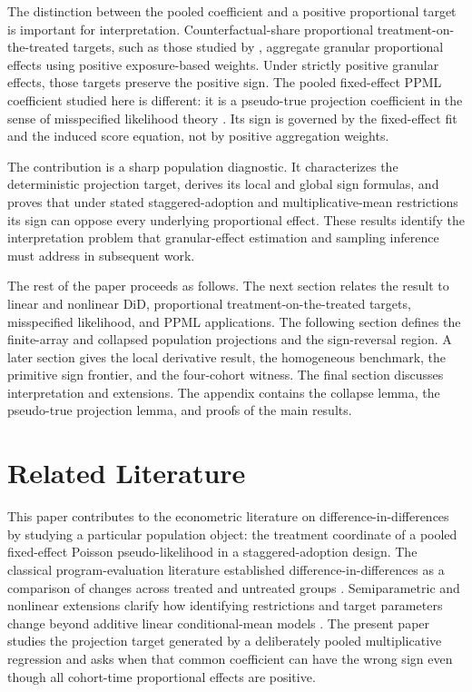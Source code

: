 \documentclass[11pt]{article}
\begin{document}
The distinction between the pooled coefficient and a positive proportional target is important for interpretation. Counterfactual-share proportional treatment-on-the-treated targets, such as those studied by \citet{MoreauKastler2025PTT}, aggregate granular proportional effects using positive exposure-based weights. Under strictly positive granular effects, those targets preserve the positive sign. The pooled fixed-effect PPML coefficient studied here is different: it is a pseudo-true projection coefficient in the sense of misspecified likelihood theory \citep{White1982MisspecifiedML,GourierouxMonfortTrognon1984Theory,GourierouxMonfortTrognon1984Poisson}. Its sign is governed by the fixed-effect fit and the induced score equation, not by positive aggregation weights.

The contribution is a sharp population diagnostic. It characterizes the deterministic projection target, derives its local and global sign formulas, and proves that under stated staggered-adoption and multiplicative-mean restrictions its sign can oppose every underlying proportional effect. These results identify the interpretation problem that granular-effect estimation and sampling inference must address in subsequent work.

The rest of the paper proceeds as follows. The next section relates the result to linear and nonlinear DiD, proportional treatment-on-the-treated targets, misspecified likelihood, and PPML applications. The following section defines the finite-array and collapsed population projections and the sign-reversal region. A later section gives the local derivative result, the homogeneous benchmark, the primitive sign frontier, and the four-cohort witness. The final section discusses interpretation and extensions. The appendix contains the collapse lemma, the pseudo-true projection lemma, and proofs of the main results.


\section{Related Literature}

This paper contributes to the econometric literature on difference-in-differences by studying a particular population object: the treatment coordinate of a pooled fixed-effect Poisson pseudo-likelihood in a staggered-adoption design. The classical program-evaluation literature established difference-in-differences as a comparison of changes across treated and untreated groups \citep{AshenfelterCard1985,AngristPischke2009,ImbensWooldridge2009}. Semiparametric and nonlinear extensions clarify how identifying restrictions and target parameters change beyond additive linear conditional-mean models \citep{Abadie2005,AtheyImbens2006,SantAnnaZhao2020}. The present paper studies the projection target generated by a deliberately pooled multiplicative regression and asks when that common coefficient can have the wrong sign even though all cohort-time proportional effects are positive.
\end{document}
